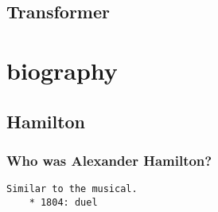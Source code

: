 \documentclass[12pt]{report}
\begin{document}
\subsection{Transformer}

\section{biography}
\subsection{Hamilton}
\subsubsection{Who was Alexander Hamilton?}
\def \year{Pam Pollack}
\begin{verbatim}
Similar to the musical.
    * 1804: duel 
\end{verbatim}
\end{document}
